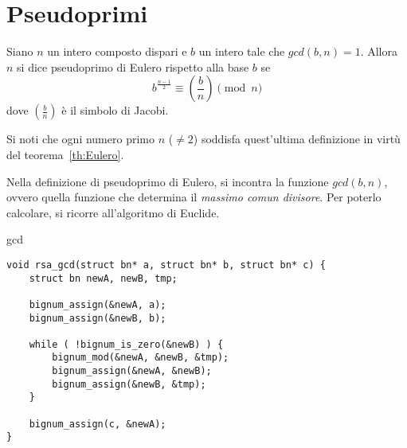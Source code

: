 %
%
\section{Pseudoprimi}
%
%


\begin{definizione}
	Siano $n$ un intero composto dispari e $b$ un intero tale che $gcd(b, n) = 1$. Allora $n$ si dice pseudoprimo di Eulero rispetto alla base $b$ se \[ b^{ \frac{n-1}{2} } \equiv \left( \frac{b}{n} \right) \pmod{n} \] dove $\left( \frac{b}{n} \right)$ è il simbolo di Jacobi.
\end{definizione}

Si noti che ogni numero primo $n$ ($\neq 2$) soddisfa quest'ultima definizione in virtù del teorema~\ref{th:Eulero}.

Nella definizione di pseudoprimo di Eulero, si incontra la funzione $gcd(b, n)$, ovvero quella funzione che determina il \emph{massimo comun divisore}. Per poterlo calcolare, si ricorre all'algoritmo di Euclide.

\begin{algorithm}[H]
	\caption{gcd}
	\label{alg:gcd}
	\DontPrintSemicolon
\end{algorithm}

\begin{lstlisting}[basicstyle=\ttfamily\small, backgroundcolor=\color{bgCode}]
void rsa_gcd(struct bn* a, struct bn* b, struct bn* c) {
    struct bn newA, newB, tmp;
    
    bignum_assign(&newA, a);
    bignum_assign(&newB, b);
    
    while ( !bignum_is_zero(&newB) ) {
        bignum_mod(&newA, &newB, &tmp);
        bignum_assign(&newA, &newB);
        bignum_assign(&newB, &tmp);
    }
    
    bignum_assign(c, &newA);
}
\end{lstlisting}

